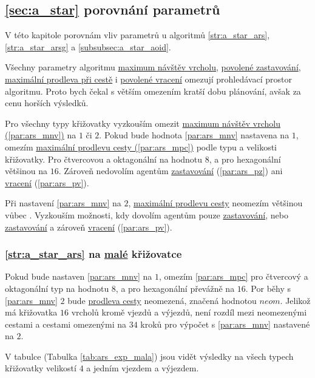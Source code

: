 \subsection{\ref{sec:a_star} porovnání parametrů}\label{subsec:a_star_porovnani_parametru}

V této kapitole porovnám vliv parametrů u algoritmů \ref{str:a_star_ars}, \ref{str:a_star_arsg} a \ref{subsubsec:a_star_aoid}.

Všechny parametry algoritmu \hyperref[par:ars_mnv]{maximum návštěv vrcholu}, \hyperref[par:ars_pz]{povolené zastavování},
\hyperref[par:ars_mpc]{maximální prodleva při cestě} i \hyperref[par:ars_pv]{povolené vracení} omezují prohledávací
prostor algoritmu.
Proto bych čekal s větším omezením kratší dobu plánování, avšak za cenu horších výsledků.

Pro všechny typy křižovatky vyzkouším omezit \hyperref[par:ars_mnv]{maximum návštěv vrcholu (\ref{par:ars_mnv})}
na $1$ či $2$.
Pokud bude hodnota \ref{par:ars_mnv} nastavena na $1$, omezím
\hyperref[par:ars_mpc]{maximální prodlevu cesty (\ref{par:ars_mpc})} podle typu a velikosti křižovatky.
Pro čtvercovou a oktagonální na hodnotu $8$, a pro hexagonální většinou na $16$.
Zároveň nedovolím agentům \hyperref[par:ars_pz]{zastavování} (\ref{par:ars_pz})
ani \hyperref[par:ars_pv]{vracení} (\ref{par:ars_pv}).

Při nastavení \ref{par:ars_mnv} na $2$, \hyperref[par:ars_mpc]{maximální prodlevu cesty}
neomezím většinou vůbec .
Vyzkouším možnosti, kdy dovolím agentům pouze \hyperref[par:ars_pz]{zastavování},
nebo \hyperref[par:ars_pz]{zastavování} a zároveň \hyperref[par:ars_pv]{vracení} (\ref{par:ars_pv}).

\subsubsection{\ref{str:a_star_ars} na \hyperref[par:data_mala]{malé} křižovatce}
\label{subsubsec:exp_ars_mala_krizovatka}

Pokud bude nastaven \ref{par:ars_mnv} na $1$, omezím \ref{par:ars_mpc}
pro čtvercový a oktagonální typ na hodnotu $8$, a pro hexagonální převážně na $16$.
Por běhy s \ref{par:ars_mnv} $2$ bude \hyperref[par:ars_mpc]{prodleva cesty} neomezená, značená hodnotou $neom$.
Jelikož má křižovatka $16$ vrcholů kromě vjezdů a výjezdů, není rozdíl mezi neomezenými cestami a
cestami omezenými na $34$ kroků pro výpočet s \ref{par:ars_mnv} nastavené na $2$.

V tabulce (Tabulka \ref{tab:ars_exp_mala}) jsou vidět výsledky na všech typech křižovatky
velikostí $4$ a jedním vjezdem a výjezdem.

